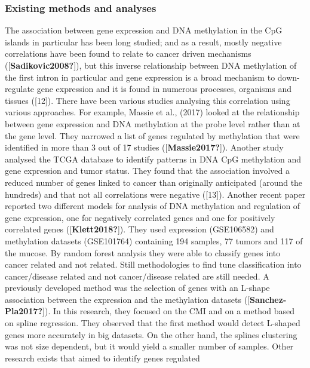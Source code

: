 \documentclass[10pt,letterpaper]{article}
\begin{document}
\hypertarget{existing-methods-and-analyses}{%
\subsubsection{Existing methods and
analyses}\label{existing-methods-and-analyses}}

The association between gene expression and DNA methylation in the CpG
islands in particular has been long studied; and as a result, mostly
negative correlations have been found to relate to cancer driven
mechanisms ({[}\textbf{Sadikovic2008?}{]}), but this inverse
relationship between DNA methylation of the first intron in particular
and gene expression is a broad mechanism to down-regulate gene
expression and it is found in numerous processes, organisms and tissues
({[}12{]}). There have been various studies analysing this correlation
using various approaches. For example, Massie et al., (2017) looked at
the relationship between gene expression and DNA methylation at the
probe level rather than at the gene level. They narrowed a list of genes
regulated by methylation that were identified in more than 3 out of 17
studies ({[}\textbf{Massie2017?}{]}). Another study analysed the TCGA
database to identify patterns in DNA CpG methylation and gene expression
and tumor status. They found that the association involved a reduced
number of genes linked to cancer than originally anticipated (around the
hundreds) and that not all correlations were negative ({[}13{]}).
Another recent paper reported two different models for analysis of DNA
methylation and regulation of gene expression, one for negatively
correlated genes and one for positively correlated genes
({[}\textbf{Klett2018?}{]}). They used expression (GSE106582) and
methylation datasets (GSE101764) containing 194 samples, 77 tumors and
117 of the mucose. By random forest analysis they were able to classify
genes into cancer related and not related. Still methodologies to find
tune classification into cancer/disease related and not cancer/disease
related are still needed. A previously developed method was the
selection of genes with an L-shape association between the expression
and the methylation datasets ({[}\textbf{Sanchez-Pla2017?}{]}). In this
research, they focused on the CMI and on a method based on spline
regression. They observed that the first method would detect L-shaped
genes more accurately in big datasets. On the other hand, the splines
clustering was not size dependent, but it would yield a smaller number
of samples. Other research exists that aimed to identify genes regulated
\end{document}
